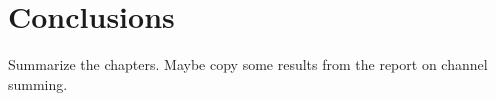 \chapter{Conclusions}
\label{ch:end}

Summarize the chapters. Maybe copy some results from the report on channel
summing.
